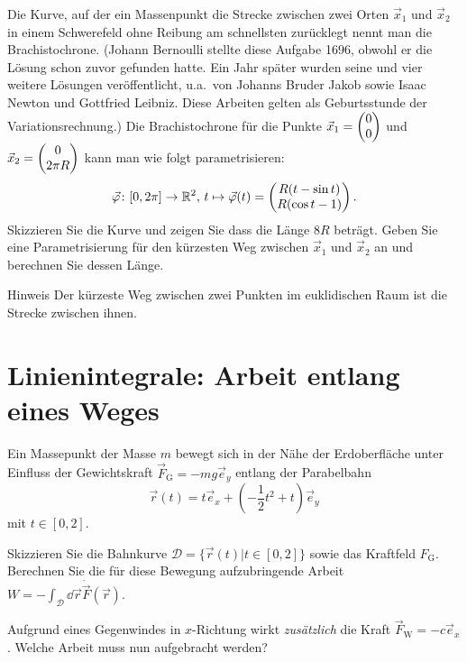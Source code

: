 \documentclass{scrartcl}
\renewcommand{\ee}{\vec{e}}
\begin{document}
Die Kurve, auf der ein Massenpunkt die Strecke zwischen zwei Orten $\vec x_1$ und $\vec x_2$ in einem Schwerefeld ohne Reibung am schnellsten zurücklegt nennt man die Brachistochrone.
(Johann Bernoulli stellte diese Aufgabe 1696, obwohl er die Lösung schon zuvor gefunden hatte. 
Ein Jahr später wurden seine und vier weitere Lösungen veröffentlicht, u.a.\ von Johanns Bruder Jakob sowie Isaac Newton und Gottfried Leibniz. 
Diese Arbeiten gelten als Geburtsstunde der Variationsrechnung.)
Die Brachistochrone für die Punkte $\vec x_1 = \begin{pmatrix}0 \\ 0\end{pmatrix}$ und $\vec x_2 = \begin{pmatrix}0 \\ 2 \pi R\end{pmatrix}$ kann man wie folgt parametrisieren:
\[
  \vec{\varphi}\colon [0, 2\pi] \to \mathbb{R}^2, \, t \mapsto \vec\varphi(t) = \begin{pmatrix}R (t - \sin t) \\ R (\cos t - 1)\end{pmatrix}.
\]
Skizzieren Sie die Kurve und zeigen Sie dass die Länge $8R$ beträgt. 
Geben Sie eine Parametrisierung für den kürzesten Weg zwischen $\vec x_1$ und $\vec x_2$ an und berechnen Sie dessen Länge.
\begin{remark}{Hinweis}
  Der kürzeste Weg zwischen zwei Punkten im euklidischen Raum ist die Strecke zwischen ihnen.
\end{remark}


\section{Linienintegrale: Arbeit entlang eines Weges}
\label{sec:linienintegrale_arbeit_entlang_eines_weges}

Ein Massepunkt der Masse $m$ bewegt sich in der Nähe der Erdoberfläche unter Einfluss der Gewichtskraft $\vec F_\mathrm{G} = - m g \ee_y$ entlang der Parabelbahn
\[
  \vec r(t) = t \ee_x + \left( -\frac{1}{2} t^2 + t \right) \ee_y
\]
mit $t \in [0,2]$.
\begin{subex}
  \item Skizzieren Sie die Bahnkurve $\mathcal{D} = \{ \vec r(t) | t \in [0,2] \}$ sowie das Kraftfeld $F_\mathrm{G}$.
  Berechnen Sie die für diese Bewegung aufzubringende Arbeit $W = - \int_\mathcal{D} \dd \vec r \dot \vec F(\vec r)$.
  \item Aufgrund eines Gegenwindes in $x$-Richtung wirkt \emph{zusätzlich} die Kraft $\vec F_\mathrm{W} = - c \ee_x$. Welche Arbeit muss nun aufgebracht werden?
\end{subex}


\end{document}
